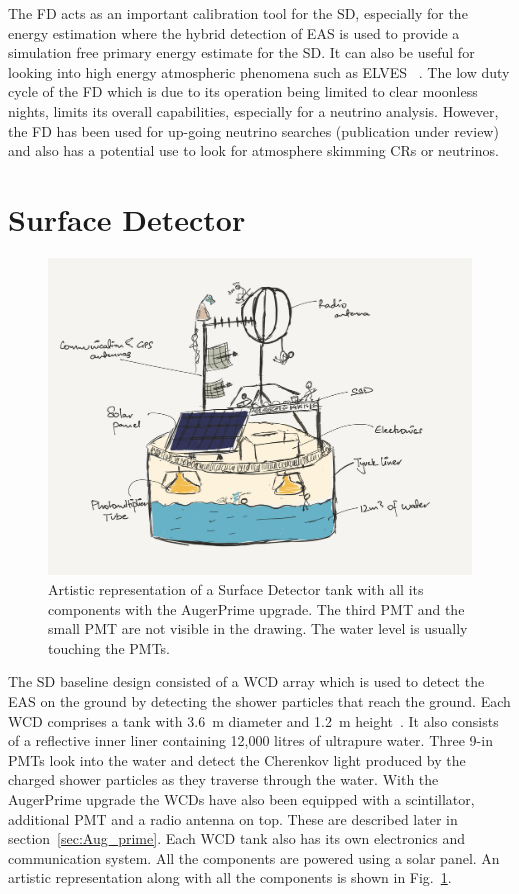 The FD acts as an important calibration tool for the SD, especially for the energy estimation where the hybrid detection of EAS is used to provide a simulation free primary energy estimate for the SD. It can also be useful for looking into high energy atmospheric phenomena such as ELVES ~\cite{PierreAuger:2020lri}. The low duty cycle of the FD which is due to its operation being limited to clear moonless nights, limits its overall capabilities, especially for a neutrino analysis. However, the FD has been used for up-going neutrino searches (publication under review) and also has a potential use to look for atmosphere skimming CRs or neutrinos.  

\section{Surface Detector}
\label{sec:Sur_det}

\begin{figure}[h!]
  \centering
  \includegraphics[width=\textwidth]{thesis_figures/Setup/SD_tank_schematics_drawing.png}
  \caption{Artistic representation of a Surface Detector tank with all its components with the AugerPrime upgrade. The third PMT and the small PMT are not visible in the drawing. The water level is usually touching the PMTs.}
  \label{fig:SD_drawing}
  \end{figure}

The \gls*{SD} baseline design consisted of a \gls{WCD} array which is used to detect the EAS on the ground by detecting the shower particles that reach the ground. Each WCD comprises a tank with 3.6 m diameter and 1.2 m height~\cite{PierreAuger:2007kus}. It also consists of a reflective inner liner containing 12,000 litres of ultrapure water. Three 9-in PMTs look into the water and detect the Cherenkov light produced by the charged shower particles as they traverse through the water. With the AugerPrime upgrade the WCDs have also been equipped with a scintillator, additional PMT and a radio antenna on top. These are described later in section~\ref{sec:Aug_prime}. Each WCD tank also has its own electronics and communication system. All the components are powered using a solar panel. An artistic representation along with all the components is shown in Fig.~\ref{fig:SD_drawing}. 

